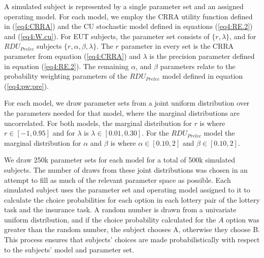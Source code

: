\documentclass[../main.tex]{subfiles}
\begin{document}
A simulated subject is represented by a single parameter set and an assigned operating model.
For each model, we employ the CRRA utility function defined in (\ref{eq4:CRRA}) and the CU stochastic model defined in equations (\ref{eq4:RE.2}) and (\ref{eq4:W.cu}).
For EUT subjects, the parameter set consists of $\lbrace r, \lambda \rbrace$, and for $\mathit{RDU_{Prelec}}$ subjects $\lbrace r, \alpha, \beta, \lambda \rbrace$.
The $r$ parameter in every set is the CRRA parameter from equation (\ref{eq4:CRRA}) and $\lambda$ is the precision parameter defined in equation (\ref{eq4:RE.2}).
The remaining $\alpha$, and $\beta$ parameters relate to the probability weighting parameters of the $\mathit{RDU_{Prelec}}$ model defined in equation (\ref{eq4:pw:pre}).

For each model, we draw parameter sets from a joint uniform distribution over the parameters needed for that model, where the marginal distributions are uncorrelated.{\footnotemark}
For both models, the marginal distribution for $r$ is where $r \in [-1, 0.95]$ and  for $\lambda$ is $\lambda \in [0.01, 0.30]$.
For the $\mathit{RDU_{Prelec}}$ model the marginal distribution for $\alpha$ and $\beta$ is where $\alpha \in [0.10, 2]$ and $\beta \in [0.10, 2]$.

We draw 250k parameter sets for each model for a total of 500k simulated subjects.
The number of draws from these joint distributions was chosen in an attempt to fill as much of the relevant parameter space as possible.{\footnotemark}
Each simulated subject uses the parameter set and operating model assigned to it to calculate the choice probabilities for each option in each lottery pair of the lottery task and the insurance task.
A random number is drawn from a univariate uniform distribution, and if the choice probability calculated for the $A$ option was greater than the random number, the subject chooses A, otherwise they choose B.
This process ensures that subjects' choices are made probabilistically with respect to the subjects' model and parameter set.{\footnotemark}
\end{document}
